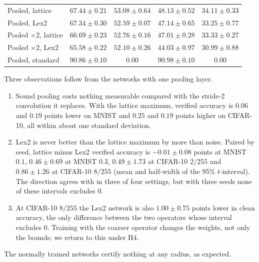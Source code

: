 \documentclass[preprint,12pt]{elsarticle}
\theoremstyle{definition}
\begin{document}
\begin{table}[ht]
\begin{tabular}{lcccc}
Pooled, lattice   & $\mathbf{67.44\pm0.21}$ & $\mathbf{53.08\pm0.64}$ & $\mathbf{48.13\pm0.52}$ & $\mathbf{34.11\pm0.33}$ \\
Pooled, Lex2      & $67.34\pm0.30$ & $52.59\pm0.07$ & $47.14\pm0.65$ & $33.25\pm0.77$ \\
Pooled $\times2$, lattice & $66.69\pm0.23$ & $52.76\pm0.16$ & $47.01\pm0.28$ & $33.33\pm0.27$ \\
Pooled $\times2$, Lex2    & $65.58\pm0.22$ & $52.10\pm0.26$ & $44.03\pm0.97$ & $30.99\pm0.88$ \\
Pooled, standard  & $90.86\pm0.10$ & $0.00$ & $90.98\pm0.10$ & $0.00$ \\
\bottomrule
\end{tabular}
\end{table}

Three observations follow from the networks with one pooling layer.
\begin{enumerate}[leftmargin=*]
\item Sound pooling costs nothing measurable compared with the stride-2 convolution it replaces. With the lattice maximum, verified accuracy is $0.06$ and $0.19$ points lower on MNIST and $0.25$ and $0.19$ points higher on CIFAR-10, all within about one standard deviation.
\item Lex2 is never better than the lattice maximum by more than noise. Paired by seed, lattice minus Lex2 verified accuracy is $-0.01\pm0.08$ points at MNIST $0.1$, $0.46\pm0.69$ at MNIST $0.3$, $0.49\pm1.73$ at CIFAR-10 $2/255$ and $0.86\pm1.26$ at CIFAR-10 $8/255$ (mean and half-width of the 95\% $t$-interval). The direction agrees with  in three of four settings, but with three seeds none of these intervals excludes $0$.
\item At CIFAR-10 $8/255$ the Lex2 network is also $1.00\pm0.75$ points lower in clean accuracy, the only difference between the two operators whose interval excludes $0$. Training with the coarser operator changes the weights, not only the bounds; we return to this under H4.
\end{enumerate}
The normally trained networks certify nothing at any radius, as expected.
\end{document}
